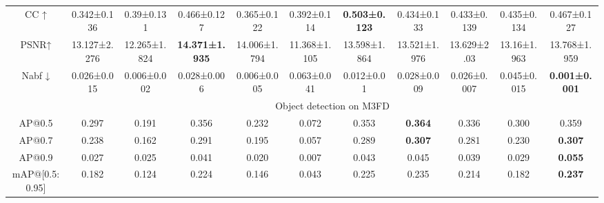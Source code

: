 \documentclass[journal]{IEEEtran}
\begin{document}
\begin{table*}[]
{\begin{tabular}{ccccccccccc}
CC    ↑            & 0.342±0.136                         & 0.39±0.131                         & {\color[HTML]{00B0F0} 0.466±0.127}  & 0.365±0.122                         & 0.392±0.114  & \textbf{0.503±0.123}               & 0.434±0.133                        & 0.433±0.139                        & 0.435±0.134 & {\color[HTML]{FF0000} 0.467±0.127}  \\
PSNR↑              & 13.127±2.276                        & 12.265±1.824                       & \textbf{14.371±1.935}               & {\color[HTML]{FF0000} 14.006±1.794} & 11.368±1.105 & 13.598±1.864                       & 13.521±1.976                       & 13.629±2.03                        & 13.16±1.963 & {\color[HTML]{00B0F0} 13.768±1.959} \\
Nabf ↓             & 0.026±0.015                         & {\color[HTML]{FF0000} 0.006±0.002} & 0.028±0.006                         & {\color[HTML]{00B0F0} 0.006±0.005}  & 0.063±0.041  & 0.012±0.01                         & 0.028±0.009                        & 0.026±0.007                        & 0.045±0.015 & \textbf{0.001±0.001}                \\ \hline
                   & \multicolumn{10}{c}{Object detection on M3FD}                                                                                                                                                                                                                                                                                          \\ \hline
AP@0.5             & 0.297                               & 0.191                              & 0.356                               & 0.232                               & 0.072        & 0.353                              & \textbf{0.364}                     & 0.336                              & 0.300       & 0.359                               \\
AP@0.7             & 0.238                               & 0.162                              & 0.291                               & 0.195                               & 0.057        & 0.289                              & \textbf{0.307}                     & 0.281                              & 0.230       & \textbf{0.307}                      \\
AP@0.9             & 0.027                               & 0.025                              & 0.041                               & 0.020                               & 0.007        & 0.043                              & 0.045                              & 0.039                              & 0.029       & \textbf{0.055}                      \\
mAP@{[}0.5:0.95{]} & 0.182                               & 0.124                              & 0.224                               & 0.146                               & 0.043        & 0.225                              & 0.235                              & 0.214                              & 0.182       & \textbf{0.237}                      \\ \hline
\end{tabular}}
\end{table*}
\end{document}
